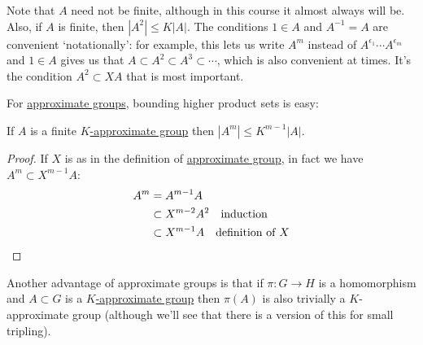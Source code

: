 \documentclass{article}
\numberwithin{equation}{section}
\begin{document}
Note that $A$ need not be finite, although in this course it almost always will be.
Also, if $A$ is finite, then $|A^2| \leq K|A|$.
The conditions $1 \in A$ and $A^{-1} = A$ are convenient `notationally': for example, this lets us write $A^m$ instead of $A^{\epsilon_1} \dotsm A^{\epsilon_m}$ and $1 \in A$ gives us that $A \subset A^2 \subset A^3 \subset \dotsb$, which is also convenient at times.
It's the condition $A^2 \subset XA$ that is most important.

For \hyperlink{def:appGroup}{approximate groups}, bounding higher product sets is easy:
\begin{nlemma}\label{lem:3.1}
  If $A$ is a finite \hyperlink{def:appGroup}{$K$-approximate group} then $|A^m| \leq K^{m-1} |A|$.
\end{nlemma}
\begin{proof}
  If $X$ is as in the definition of \hyperlink{def:appGroup}{approximate group}, in fact we have $A^m \subset X^{m-1} A$:
  \begin{align*}
    A^m &= A^{m-1} A \\
        &\subset X^{m-2} A^2 \quad \text{induction}\\ %
        &\subset X^{m-1} A \quad \text{definition of $X$} \qedhere
  \end{align*}
\end{proof}
Another advantage of approximate groups is that if $\pi: G \to H$ is a homomorphism and $A \subset G$ is a \hyperlink{def:appGroup}{$K$-approximate group} then $\pi(A)$ is also trivially a $K$-approximate group (although we'll see that there is a version of this for small tripling).
\end{document}
